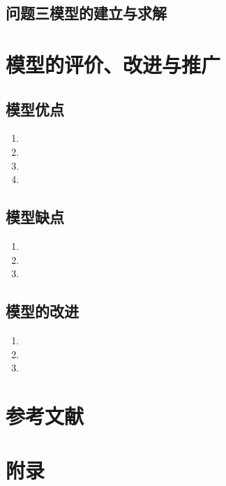 \documentclass[a4paper]{article}
\begin{document}
	\subsection{问题三模型的建立与求解}
	
	
	\section{模型的评价、改进与推广}
	\subsection{模型优点}
	\begin{enumerate}
		\item 
		\item 
		\item 
		\item 
	\end{enumerate}
	
	\subsection{模型缺点}
	\begin{enumerate}
		\item 
		\item 
		\item 
	\end{enumerate}
	
	\subsection{模型的改进}
	\begin{enumerate}
		\item 
		\item 
		\item 
	\end{enumerate}
	
	\section{参考文献}
	\vspace{-2em} %
	\begin{thebibliography}{9}  
	\end{thebibliography}
	
	\newpage
	\section*{附录}
	
\end{document}
